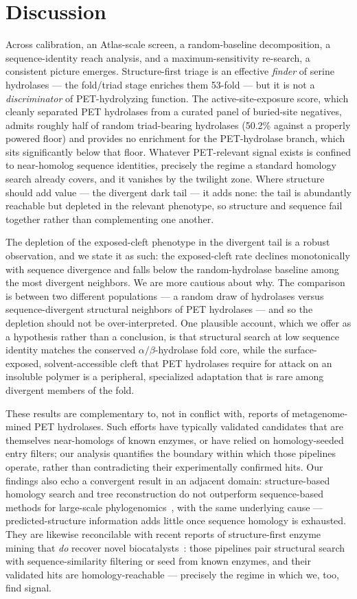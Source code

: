 \documentclass[10pt]{article}
\begin{document}
\section{Discussion}
Across calibration, an Atlas-scale screen, a random-baseline decomposition, a sequence-identity reach analysis, and a maximum-sensitivity re-search, a consistent picture emerges. Structure-first triage is an effective \emph{finder} of serine hydrolases --- the fold/triad stage enriches them 53-fold --- but it is not a \emph{discriminator} of PET-hydrolyzing function. The active-site-exposure score, which cleanly separated PET hydrolases from a curated panel of buried-site negatives, admits roughly half of random triad-bearing hydrolases (50.2\% against a properly powered floor) and provides no enrichment for the PET-hydrolase branch, which sits significantly below that floor. Whatever PET-relevant signal exists is confined to near-homolog sequence identities, precisely the regime a standard homology search already covers, and it vanishes by the twilight zone. Where structure should add value --- the divergent dark tail --- it adds none: the tail is abundantly reachable but depleted in the relevant phenotype, so structure and sequence fail together rather than complementing one another.

The depletion of the exposed-cleft phenotype in the divergent tail is a robust observation, and we state it as such: the exposed-cleft rate declines monotonically with sequence divergence and falls below the random-hydrolase baseline among the most divergent neighbors. We are more cautious about why. The comparison is between two different populations --- a random draw of hydrolases versus sequence-divergent structural neighbors of PET hydrolases --- and so the depletion should not be over-interpreted. One plausible account, which we offer as a hypothesis rather than a conclusion, is that structural search at low sequence identity matches the conserved $\alpha/\beta$-hydrolase fold core, while the surface-exposed, solvent-accessible cleft that PET hydrolases require for attack on an insoluble polymer is a peripheral, specialized adaptation that is rare among divergent members of the fold.

These results are complementary to, not in conflict with, reports of metagenome-mined PET hydrolases. Such efforts have typically validated candidates that are themselves near-homologs of known enzymes, or have relied on homology-seeded entry filters; our analysis quantifies the boundary within which those pipelines operate, rather than contradicting their experimentally confirmed hits. Our findings also echo a convergent result in an adjacent domain: structure-based homology search and tree reconstruction do not outperform sequence-based methods for large-scale phylogenomics~\cite{mutti2025}, with the same underlying cause --- predicted-structure information adds little once sequence homology is exhausted. They are likewise reconcilable with recent reports of structure-first enzyme mining that \emph{do} recover novel biocatalysts~\cite{nortonbaker2025,jaito2026}: those pipelines pair structural search with sequence-similarity filtering or seed from known enzymes, and their validated hits are homology-reachable --- precisely the regime in which we, too, find signal.
\end{document}
